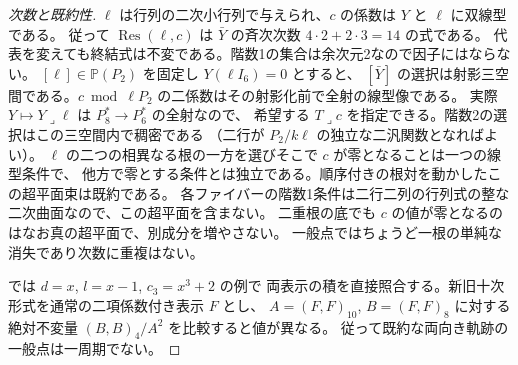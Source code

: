 \begin{proof}[次数と既約性]
$\ell$ は行列の二次小行列で与えられ、$c$ の係数は $Y$ と $\ell$ に双線型である。
従って $\operatorname{Res}(\ell,c)$ は $\bar Y$ の斉次次数 $4\cdot2+2\cdot3=14$ の式である。
代表を変えても終結式は不変である。階数1の集合は余次元2なので因子にはならない。
$[\ell]\in\mathbb P(P_2)$ を固定し $Y(\ell I_6)=0$ とすると、
$[\bar Y]$ の選択は射影三空間である。$c\bmod\ell P_2$ の二係数はその射影化前で全射の線型像である。
実際 $Y\mapsto Y\mathbin{\lrcorner}\ell$ は $P_8^*\to P_6^*$ の全射なので、
希望する $T\mathbin{\lrcorner}c$ を指定できる。階数2の選択はこの三空間内で稠密である
（二行が $P_2/k\ell$ の独立な二汎関数となればよい）。
$\ell$ の二つの相異なる根の一方を選びそこで $c$ が零となることは一つの線型条件で、
他方で零とする条件とは独立である。順序付きの根対を動かしたこの超平面束は既約である。
各ファイバーの階数1条件は二行二列の行列式の整な二次曲面なので、この超平面を含まない。
二重根の底でも $c$ の値が零となるのはなお真の超平面で、別成分を増やさない。
一般点ではちょうど一根の単純な消失であり次数に重複はない。

では $d=x$, $l=x-1$, $c_3=x^3+2$ の例で
両表示の積を直接照合する。新旧十次形式を通常の二項係数付き表示 $F$ とし、
$A=(F,F)_{10}$, $B=(F,F)_8$ に対する絶対不変量 $(B,B)_4/A^2$ を比較すると値が異なる。
従って既約な両向き軌跡の一般点は一周期でない。
\end{proof}
